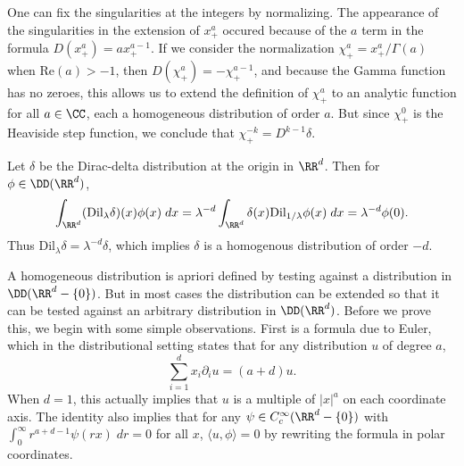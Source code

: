 \begin{example}
    One can fix the singularities at the integers by normalizing. The appearance of the singularities in the extension of $x^a_+$ occured because of the $a$ term in the formula $D(x^a_+) = a x^{a-1}_+$. If we consider the normalization $\chi^a_+ = x^a_+ / \Gamma(a)$ when $\text{Re}(a) > -1$, then $D(\chi^a_+) = - \chi^{a-1}_+$, and because the Gamma function has no zeroes, this allows us to extend the definition of $\chi^a_+$ to an analytic function for all $a \in \CC$, each a homogeneous distribution of order $a$. But since $\chi^0_+$ is the Heaviside step function, we conclude that $\chi^{-k}_+ = D^{k-1} \delta$.
\end{example}

\begin{example}
  Let $\delta$ be the Dirac-delta distribution at the origin in $\RR^d$. Then for $\phi \in \DD(\RR^d)$,
  \begin{align*}
    \int_{\RR^d} (\text{Dil}_\lambda \delta)(x) \phi(x)\; dx = \lambda^{-d} \int_{\RR^d} \delta(x) \text{Dil}_{1/\lambda} \phi(x)\; dx = \lambda^{-d} \phi(0).
  \end{align*}
  Thus $\text{Dil}_\lambda \delta = \lambda^{-d} \delta$, which implies $\delta$ is a homogenous distribution of order $-d$.
\end{example}

A homogeneous distribution is apriori defined by testing against a distribution in $\DD(\RR^d - \{ 0 \})$. But in most cases the distribution can be extended so that it can be tested against an arbitrary distribution in $\DD(\RR^d)$. Before we prove this, we begin with some simple observations. First is a formula due to Euler, which in the distributional setting states that for any distribution $u$ of degree $a$,
%
\[ \sum_{i = 1}^d x_i \partial_i u = (a + d) u. \]
%
When $d = 1$, this actually implies that $u$ is a multiple of $|x|^a$ on each coordinate axis. The identity also implies that for any $\psi \in C_c^\infty(\RR^d - \{ 0 \})$ with $\int_0^\infty r^{a + d-1} \psi(rx)\; dr = 0$ for all $x$, $\langle u, \phi \rangle = 0$ by rewriting the formula in polar coordinates.

